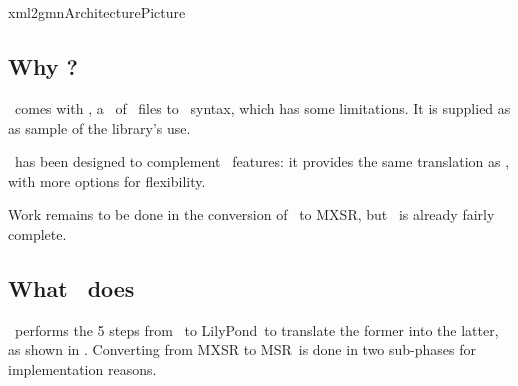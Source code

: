 



\chapter{\xmlToGmn\ }

{xml2gmnArchitecturePicture}


\section{Why \xmlToGmn?}

\libmusicxml\ comes with \xmlToGuido, a \converter\ of \mxml\ files to \guido\ syntax, which has some limitations. It is supplied as as sample of the library's use.

\xmlToGmn\ has been designed to complement \libmusicxml\ features: it provides the same translation as \xmlToGuido, with more options for flexibility.

Work remains to be done in the conversion of \msrRepr\ to MXSR, but \xmlToGmn\ is already fairly complete.


\section{What \xmlToGmn\ does}

\xmlToGmn\ performs the 5 steps from \mxml\ to LilyPond\ to translate the former into the latter, as shown in . Converting from MXSR to MSR\ is done in two sub-phases for implementation reasons.

